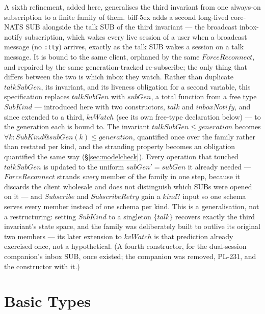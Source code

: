 \documentclass[a4paper,10pt,fleqn]{article}
\begin{document}
A sixth refinement, added here, generalises the third invariant from one
always-on subscription to a finite family of them.  biff-5ex adds a second
long-lived core-NATS SUB alongside the talk SUB of the third
invariant --- the broadcast inbox-notify subscription, which wakes every
live session of a user when a broadcast message (no \texttt{:tty}) arrives,
exactly as the talk SUB wakes a session on a talk message.  It is bound to
the same client, orphaned by the same $ForceReconnect$, and repaired by the
same generation-tracked re-subscribe; the only thing that differs between
the two is which inbox they watch.  Rather than duplicate $talkSubGen$,
its invariant, and its liveness obligation for a second variable, this
specification replaces $talkSubGen$ with $subGen$, a total function from a
free type $SubKind$ --- introduced here with two constructors, $talk$ and
$inboxNotify$, and since extended to a third, $kvWatch$ (see its own
free-type declaration below) --- to the generation each is bound to.  The
invariant $talkSubGen \leq generation$ becomes $\forall k : SubKind @
subGen(k) \leq generation$, quantified once over the family rather than
restated per kind, and the stranding property becomes an obligation
quantified the same way (\S\ref{sec:modelcheck}).  Every operation that
touched $talkSubGen$ is updated to the uniform $subGen' = subGen$ it
already needed --- $ForceReconnect$ strands \emph{every} member of the
family in one step, because it discards the client wholesale and does not
distinguish which SUBs were opened on it --- and $Subscribe$ and
$SubscribeRetry$ gain a $kind?$ input so one schema serves every member
instead of one schema per kind.  This is a generalisation, not a
restructuring: setting $SubKind$ to a singleton $\{ talk \}$ recovers
exactly the third invariant's state space, and the family was
deliberately built to outlive its original two members --- its later
extension to $kvWatch$ is that prediction already exercised once, not a
hypothetical.  (A fourth constructor, for the dual-session
companion's inbox SUB, once existed; the companion was removed, PL-231,
and the constructor with it.)

\section{Basic Types}

\begin{zed}
\end{zed}
\end{document}
